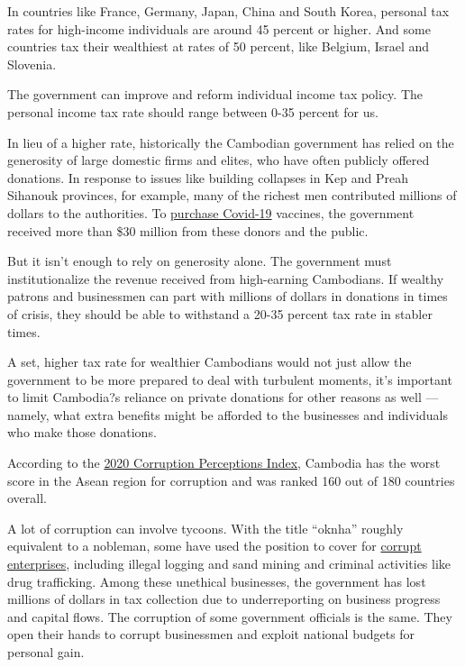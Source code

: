 \documentclass[10pt,a4paper]{letter}
\begin{document}
In countries like France, Germany, Japan, China and South Korea, personal tax rates for high-income individuals are around 45 percent or higher. And some countries tax their wealthiest at rates of 50 percent, like Belgium, Israel and Slovenia.

The government can improve and reform individual income tax policy. The personal income tax rate should range between 0-35 percent for us.

In lieu of a higher rate, historically the Cambodian government has relied on the generosity of large domestic firms and elites, who have often publicly offered donations. In response to issues like building collapses in Kep and Preah Sihanouk provinces, for example, many of the richest men contributed millions of dollars to the authorities. To \href{https://thediplomat.com/2020/12/cambodia-vaccine-push-offers-window-into-elite-networks/}{purchase Covid-19} vaccines, the government received more than \$30 million from these donors and the public.

But it isn't enough to rely on generosity alone. The government must institutionalize the revenue received from high-earning Cambodians. If wealthy patrons and businessmen can part with millions of dollars in donations in times of crisis, they should be able to withstand a 20-35 percent tax rate in stabler times.

A set, higher tax rate for wealthier Cambodians would not just allow the government to be more prepared to deal with turbulent moments, it's important to limit Cambodia?s reliance on private donations for other reasons as well --- namely, what extra benefits might be afforded to the businesses and individuals who make those donations.

According to the \href{https://www.transparency.org/en/cpi/2020/index/khm}{2020 Corruption Perceptions Index}, Cambodia has the worst score in the Asean region for corruption and was ranked 160 out of 180 countries overall.

A lot of corruption can involve tycoons. With the title ``oknha'' roughly equivalent to a nobleman, some have used the position to cover for \href{https://thediplomat.com/2021/05/cambodia-sets-up-working-group-to-scrutinize-granting-of-honorific-title/}{corrupt enterprises}, including illegal logging and sand mining and criminal activities like drug trafficking. Among these unethical businesses, the government has lost millions of dollars in tax collection due to underreporting on business progress and capital flows. The corruption of some government officials is the same. They open their hands to corrupt businessmen and exploit national budgets for personal gain.
\end{document}
